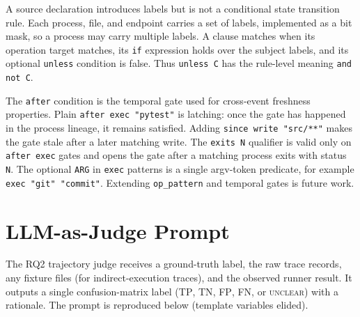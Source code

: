 A source declaration introduces labels but is not a conditional state transition rule.
Each process, file, and endpoint carries a set of labels, implemented as a bit mask, so a process may carry multiple labels.
A clause matches when its operation target matches, its \texttt{if} expression holds over the subject labels, and its optional \texttt{unless} condition is false.
Thus \texttt{unless C} has the rule-level meaning \texttt{and not C}.

The \texttt{after} condition is the temporal gate used for cross-event freshness properties.
Plain \texttt{after exec "pytest"} is latching: once the gate has happened in the process lineage, it remains satisfied.
Adding \texttt{since write "src/**"} makes the gate stale after a later matching write.
The \texttt{exits N} qualifier is valid only on \texttt{after exec} gates and opens the gate after a matching process exits with status \texttt{N}.
The optional \texttt{ARG} in \texttt{exec} patterns is a single argv-token predicate, for example \texttt{exec "git" "commit"}.
Extending \texttt{op\_pattern} and temporal gates is future work.

\section{LLM-as-Judge Prompt}
\label{sec:appendix:judge}

The RQ2 trajectory judge receives a ground-truth label, the raw trace records, any fixture files (for indirect-execution traces), and the observed runner result.
It outputs a single confusion-matrix label (\textsc{TP}, \textsc{TN}, \textsc{FP}, \textsc{FN}, or \textsc{unclear}) with a rationale.
The prompt is reproduced below (template variables elided).

